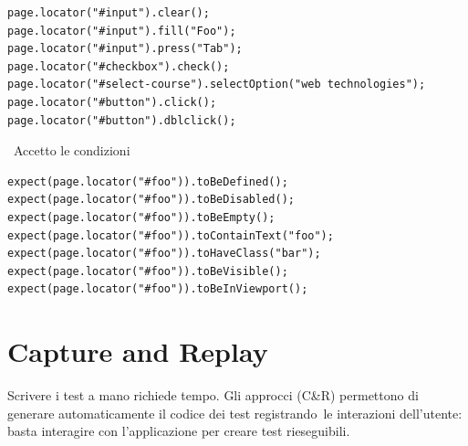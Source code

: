 \begin{affianco}[0.52][c]
\codicepiccolo
\begin{lstlisting}[style=ts, name=azioni.ts]
page.locator("#input").clear();
page.locator("#input").fill("Foo");
page.locator("#input").press("Tab");
page.locator("#checkbox").check();
page.locator("#select-course").selectOption("web technologies");
page.locator("#button").click();
page.locator("#button").dblclick();
\end{lstlisting}
\risultato
\begin{browser}
  \par\vspace{5pt}
  \ {\wtuifont Accetto le condizioni}\par\vspace{5pt}
  \par\vspace{5pt}
\end{browser}
\end{affianco}

\begin{lstlisting}[style=ts, name=asserzioni.ts]
expect(page.locator("#foo")).toBeDefined();
expect(page.locator("#foo")).toBeDisabled();
expect(page.locator("#foo")).toBeEmpty();
expect(page.locator("#foo")).toContainText("foo");
expect(page.locator("#foo")).toHaveClass("bar");
expect(page.locator("#foo")).toBeVisible();
expect(page.locator("#foo")).toBeInViewport();
\end{lstlisting}


\section{Capture and Replay}

Scrivere i test a mano richiede tempo. Gli approcci 
(C\&R) permettono di generare automaticamente il codice dei test
\guillemotleft registrando\guillemotright\ le interazioni dell'utente: basta interagire con
l'applicazione per creare test rieseguibili.


